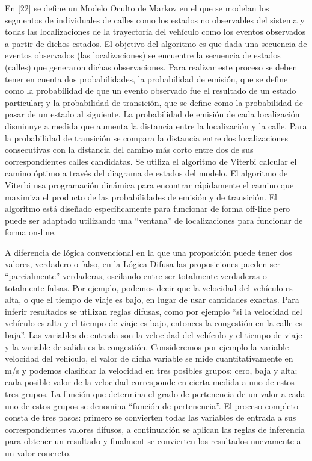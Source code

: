 \documentclass[final,fmstyle]{fpunathesis}
\begin{document}
En [22] se define un Modelo Oculto de Markov en el que se modelan los segmentos de individuales de calles como los estados no observables del sistema y todas las localizaciones de la trayectoria del vehículo como los eventos observados a partir de dichos estados. El objetivo del algoritmo es que dada una secuencia de eventos observados (las localizaciones) se encuentre la secuencia de estados (calles) que generaron dichas observaciones. Para realizar este proceso se deben tener en cuenta dos probabilidades, la probabilidad de emisión, que se define como la probabilidad de que un evento observado fue el resultado de un estado particular; y la probabilidad de transición, que se define como la probabilidad de pasar de un estado al siguiente. La probabilidad de emisión de cada localización disminuye a medida que aumenta la distancia entre la localización y la calle. Para la probabilidad de transición se compara la distancia entre dos localizaciones consecutivas con la distancia del camino más corto entre dos de sus correspondientes calles candidatas. Se utiliza el algoritmo de Viterbi calcular el camino óptimo a través del diagrama de estados del modelo. El algoritmo de Viterbi usa programación dinámica para encontrar rápidamente el camino que maximiza el producto de las probabilidades de emisión y de transición. El algoritmo está diseñado específicamente para funcionar de forma off-line pero puede ser adaptado utilizando una “ventana” de localizaciones para funcionar de forma on-line.

A diferencia de lógica convencional en la que una proposición puede tener dos valores, verdadero o falso, en la Lógica Difusa las proposiciones pueden ser “parcialmente” verdaderas, oscilando entre ser totalmente verdaderas o totalmente falsas. Por ejemplo, podemos decir que la velocidad del vehículo es alta, o que el tiempo de viaje es bajo, en lugar de usar cantidades exactas. Para inferir resultados se utilizan reglas difusas, como por ejemplo “si la velocidad del vehículo es alta y el tiempo de viaje es bajo, entonces la congestión en la calle es baja”. Las variables de entrada son la velocidad del vehículo y el tiempo de viaje y la variable de salida es la congestión. Consideremos por ejemplo la variable velocidad del vehículo, el valor de dicha variable se mide cuantitativamente en m/s y podemos clasificar la velocidad en tres posibles grupos: cero, baja y alta; cada posible valor de la velocidad corresponde en cierta medida a uno de estos tres grupos. La función  que determina el grado de pertenencia de un valor a cada uno de estos grupos se denomina “función de pertenencia”. El proceso completo consta de tres pasos: primero se convierten todas las variables de entrada a sus correspondientes valores difusos, a continuación se aplican las reglas de inferencia para obtener un resultado y finalment se convierten los resultados nuevamente a un valor concreto.
\end{document}
